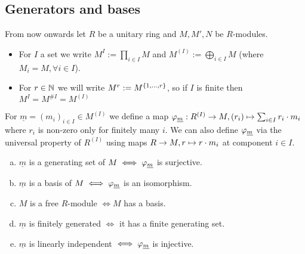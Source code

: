 \documentclass[a4paper]{report}
\begin{document}
\subsection{Generators and bases}
From now onwards let $R$ be a unitary ring and $M, M', N$ be $R$-modules.
\begin{nota*}
  \begin{itemize}
    \item For $I$ a set we write $M^{I}:= \prod_{i \in I}M$ and $M^{(I)}:= \bigoplus_{i \in I}M$ (where $M_{i} = M, \forall i \in I$).
          \item For $r \in \mathbb{N}$ we will write $M^{r}:= M^{\{1, \ldots, r\}}$, so if $I$ is finite then $M^{I} = M^{\#I} = M^{(I)}$
  \end{itemize}
\end{nota*}

\begin{defi} %
  For $\underline m = (m_{i})_{i \in I} \in M^{(I)}$ we define a map $\varphi_{\underline m}: R^{(I)} \to M, (r_{i}) \mapsto \sum_{i \in I}r_{i} \cdot m_{i}$ where $r_{i}$ is non-zero only for finitely many $i$. %
  We can also define $\varphi_{\underline m}$ via the universal property of $R^{(I)}$ using maps $R \to M, r \mapsto r \cdot m_{i}$ at component $i \in I$. %
  \begin{enumerate}[(a)]
    \item $\underline m$ is a generating set of $M \iff \varphi_{\underline m}$ is surjective.
    \item $\underline m$ is a basis of $M \iff \varphi_{\underline m}$ is an isomorphism.
    \item $M$ is a free $R$-module $\iff M$ has a basis.
    \item $\underline m$ is finitely generated $\iff$ it has a finite generating set.
    \item $\underline m$ is linearly independent $\iff \varphi_{\underline m}$ is injective.
  \end{enumerate}
\end{defi}
\end{document}
